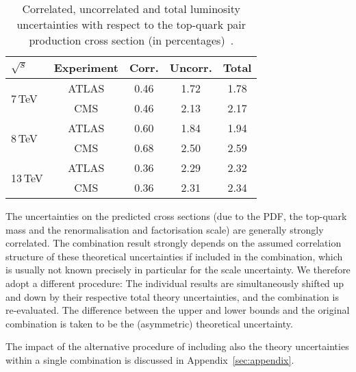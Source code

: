 \begin{enumerate}
    \newcommand{\tableWidthLumi}{2.5cm}  
    \begin{table*}[ht]
    { %
    \begin{center}  
    \begin{tabular}{l c c c c}
    \toprule
    $\sqrt{s}$                & Experiment & Corr.  & Uncorr. & Total \\
    \midrule
    \multirow{2}{*}{7\,TeV}   &  ATLAS     &  0.46  &  1.72  &  1.78 \\
                              &  CMS       &  0.46  &  2.13  &  2.17 \\
    \multirow{2}{*}{8\,TeV}   &  ATLAS     &  0.60  &  1.84  &  1.94 \\
                              &  CMS       &  0.68  &  2.50  &  2.59 \\
    \multirow{2}{*}{13\,TeV}  &  ATLAS     &  0.36  &  2.29  &  2.32 \\
                              &  CMS       &  0.36  &  2.31  &  2.34 \\
    \bottomrule
    \end{tabular} 
    \end{center} 
    \caption{\small
    Correlated, uncorrelated and total luminosity uncertainties with
    respect to the top-quark pair production cross section (in
    percentages)~\cite{topcombination_7TeV,topcombination_8TeV,Aad:2013ucp,Aaboud:2016hhf,CMS:2012rua,CMS:2013gfa,CMS:2016eto}.
    }
    \label{tab:lumitable}
    }
    \end{table*} 
\end{enumerate}

The uncertainties on the predicted cross sections (due to the PDF, the
top-quark mass and the renormalisation and factorisation scale) 
are generally strongly correlated. 
%
The combination result strongly depends on the assumed correlation
structure of these theoretical uncertainties if included in the
combination, which is usually not known precisely in particular for
the scale uncertainty.
%
We therefore adopt
a different procedure: The individual results are
simultaneously shifted up and down by their respective total theory uncertainties, and the
combination is re-evaluated.
% 
The difference between the upper and
lower bounds and the original combination is taken to be the
(asymmetric) theoretical uncertainty.

The impact of the alternative procedure of including also the theory
uncertainties within a single combination is discussed in
Appendix~\ref{sec:appendix}.

